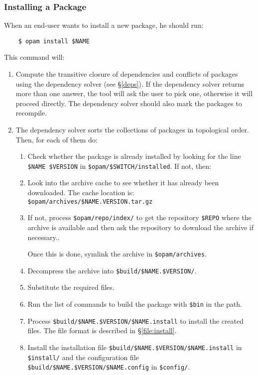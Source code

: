 \documentclass[a4paper,11pt]{article}
\begin{document}
\subsubsection{Installing a Package}
\label{opam-install}

When an end-user wants to install a new package, he should run:

\begin{verbatim}
    $ opam install $NAME
\end{verbatim}

This command will:

\begin{enumerate}

\item Compute the transitive closure of dependencies and conflicts of
  packages using the dependency solver (see \S\ref{deps}). If the
  dependency solver returns more than one answer, the tool will ask
  the user to pick one, otherwise it will proceed directly. The
  dependency solver should also mark the packages to recompile.

\item The dependency solver sorts the collections of packages in
  topological order. Then, for each of them do:

\begin{enumerate}

\item Check whether the package is already installed by looking for
  the line \verb+$NAME $VERSION+ in \verb+$opam/$SWITCH/installed+.
  If not, then:

\item Look into the archive cache to see whether it has already been
  downloaded. The cache location is:
  \verb+$opam/archives/$NAME.VERSION.tar.gz+

\item If not, process \verb+$opam/repo/index/+ to get the repository
  \verb+$REPO+ where the archive is available and then ask the
  repository to download the archive if necessary..

  Once this is done, symlink the archive in \verb+$opam/archives+.

\item Decompress the archive into \verb+$build/$NAME.$VERSION/+.

\item Substitute the required files.

\item Run the list of commands to build the package with \verb+$bin+
  in the path.

\item Process \verb+$build/$NAME.$VERSION/$NAME.install+ to install
  the created files. The file format is described in \S\ref{file:install}.

\item Install the installation file
  \verb+$build/$NAME.$VERSION/$NAME.install+ in \verb+$install/+ and
  the configuration file \verb+$build/$NAME.$VERSION/$NAME.config+ in
  \verb+$config/+.

\end{enumerate}
\end{enumerate}
\end{document}
